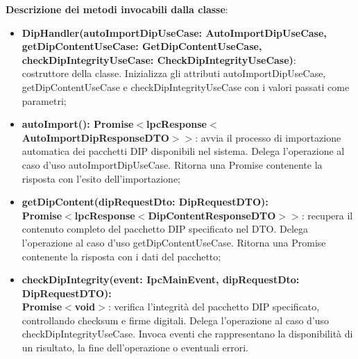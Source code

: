 \documentclass[a4paper,12pt]{article}
\begin{document}
{{                \noindent \textbf{Descrizione dei metodi invocabili dalla classe}:
                \begin{itemize}
                    \item \textbf{DipHandler(autoImportDipUseCase: AutoImportDipUseCase,\\ getDipContentUseCase: GetDipContentUseCase,\\ checkDipIntegrityUseCase: CheckDipIntegrityUseCase)}:\\ costruttore della classe. Inizializza gli attributi autoImportDipUseCase, getDipContentUseCase e checkDipIntegrityUseCase con i valori passati come parametri;
                    \item \textbf{autoImport(): Promise$<$lpcResponse$<$AutoImportDipResponseDTO$>>$}: avvia il processo di importazione automatica dei pacchetti DIP disponibili nel sistema. Delega l'operazione al caso d'uso autoImportDipUseCase. Ritorna una Promise contenente la risposta con l'esito dell'importazione;
                    \item \textbf{getDipContent(dipRequestDto: DipRequestDTO):\\ Promise$<$lpcResponse$<$DipContentResponseDTO$>>$}: recupera il contenuto completo del pacchetto DIP specificato nel DTO. Delega l'operazione al caso d'uso getDipContentUseCase. Ritorna una Promise contenente la risposta con i dati del pacchetto;
                    \item \textbf{checkDipIntegrity(event: IpcMainEvent, dipRequestDto: DipRequestDTO):\\ Promise$<$void$>$}: verifica l'integrità del pacchetto DIP specificato, controllando checksum e firme digitali. Delega l'operazione al caso d'uso checkDipIntegrityUseCase. Invoca eventi che rappresentano la disponibilità di un risultato, la fine dell'operazione o eventuali errori.
                \end{itemize}

}}
\end{document}
